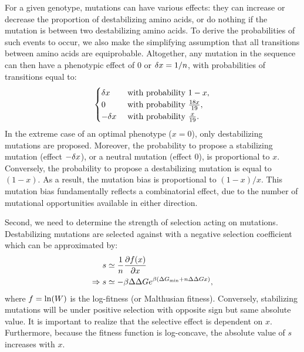 \documentclass{article}
\begin{document}
For a given genotype, mutations can have various effects: they can increase or decrease the proportion of destabilizing amino acids, or do nothing if the mutation is between two destabilizing amino acids.
To derive the probabilities of such events to occur, we also make the simplifying assumption that all transitions between amino acids are equiprobable.
Altogether, any mutation in the sequence can then have a phenotypic effect of $0$ or $\delta x=1 /n$, with probabilities of transitions equal to:
\begin{gather}
    \begin{cases}
        \delta x &\text{ with probability } 1-x, \\
        0 &\text{ with probability } \frac{18 x }{19}, \\
        -\delta x &\text{ with probability } \frac{x}{19}.\\
    \end{cases} \label{eq:proba}
\end{gather}
In the extreme case of an optimal {phenotype} ($x = 0$), only destabilizing mutations are proposed.
Moreover, the probability to propose a stabilizing mutation (effect $-\delta x$), or a {neutral} mutation (effect $0$), is proportional to $x$.
Conversely, the probability to propose a destabilizing mutation is equal to $(1-x)$.
As a result, the mutation bias is proportional to $(1-x)/x$.
This mutation bias fundamentally reflects a combinatorial effect, due to the number of mutational opportunities available in either direction.

Second, we need to determine the strength of selection acting on mutations.
Destabilizing mutations are selected against with a negative selection coefficient which can be approximated by:
\begin{align}
    s & \simeq \frac{1}{n}\frac{ \partial f (x) }{\partial x} \label{eq:s} \\
    \Rightarrow s & \simeq - \beta \Delta \Delta G e^{\beta (\Delta G_{\text{min}} + n \Delta \Delta G x)}, \label{eq:s-unfolded}
\end{align}
where $ f = \ln (W)$ is the log-fitness (or Malthusian fitness).
Conversely, stabilizing mutations will be under positive selection with opposite sign but same absolute value.
It is important to realize that the selective effect is dependent on $x$.
Furthermore, because the fitness function is log-concave, the absolute value of $s$ increases with $x$.
\end{document}
